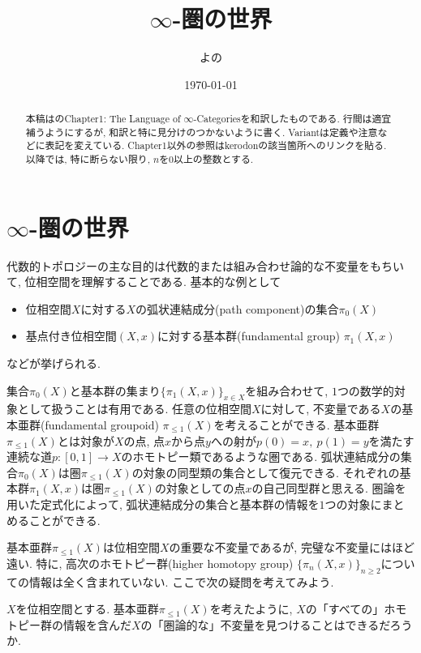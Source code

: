 \documentclass[uplatex, a4paper, 14Q, dvipdfmx]{jsreport}
\title{$\infty$-圏の世界}
\author{よの}
\date{\today}
\begin{document}
\maketitle

\begin{abstract}
  本稿は\cite{kerodon}のChapter1: The Language of $\infty$-Categoriesを和訳したものである. 
  行間は適宜補うようにするが, 和訳と特に見分けのつかないように書く. 
  Variantは定義や注意などに表記を変えている. 
  Chapter1以外の参照はkerodonの該当箇所へのリンクを貼る. 
  以降では, 特に断らない限り, $n$を$0$以上の整数とする. 
\end{abstract}

\setcounter{tocdepth}{2}
\tableofcontents

\setcounter{chapter}{0}
\chapter{\texorpdfstring{$\infty$}{infty}-圏の世界}

代数的トポロジーの主な目的は代数的または組み合わせ論的な不変量をもちいて, 位相空間を理解することである. 
基本的な例として
\begin{itemize}
  \item 位相空間$X$に対する$X$の弧状連結成分(path component)の集合$\pi_0(X)$ 
  \item 基点付き位相空間$(X,x)$に対する基本群(fundamental group) $\pi_1(X,x)$ 
\end{itemize}
などが挙げられる. 

集合$\pi_0(X)$と基本群の集まり$\{\pi_1(X,x)\}_{x \in X}$を組み合わせて, $1$つの数学的対象として扱うことは有用である. 
任意の位相空間$X$に対して, 不変量である$X$の基本亜群(fundamental groupoid) $\pi_{\leq 1}(X)$を考えることができる. 
基本亜群$\pi_{\leq 1}(X)$とは対象が$X$の点, 点$x$から点$y$への射が$p(0)=x,~ p(1)=y$を満たす連続な道$p:[0,1] \to X$のホモトピー類であるような圏である.
弧状連結成分の集合$\pi_0(X)$は圏$\pi_{\leq 1}(X)$の対象の同型類の集合として復元できる. 
それぞれの基本群$\pi_1(X,x)$は圏$\pi_{\leq 1}(X)$の対象としての点$x$の自己同型群と思える. 
圏論を用いた定式化によって, 弧状連結成分の集合と基本群の情報を$1$つの対象にまとめることができる.

基本亜群$\pi_{\leq 1}(X)$は位相空間$X$の重要な不変量であるが, 完璧な不変量にはほど遠い. 
特に, 高次のホモトピー群(higher homotopy group) $\{\pi_n(X,x)\}_{n \geq 2}$についての情報は全く含まれていない. 
ここで次の疑問を考えてみよう. 

\begin{que}
  $X$を位相空間とする. 
  基本亜群$\pi_{\leq 1}(X)$を考えたように, $X$の「すべての」ホモトピー群の情報を含んだ$X$の「圏論的な」不変量を見つけることはできるだろうか. 
\end{que}  
\end{document}
